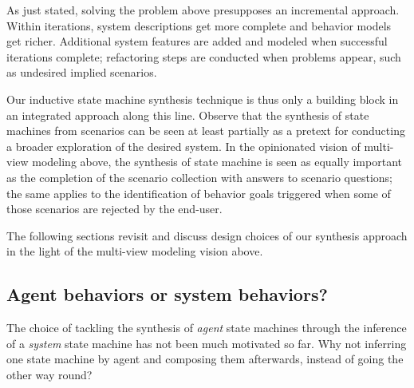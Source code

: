 As just stated, solving the problem above presupposes an incremental approach. Within iterations, system descriptions get more complete and behavior models get richer. Additional system features are added and modeled when successful iterations complete; refactoring steps are conducted when problems appear, such as undesired implied scenarios.

Our inductive state machine synthesis technique is thus only a building block in an integrated approach along this line. Observe that the synthesis of state machines from scenarios can be seen at least partially as a pretext for conducting a broader exploration of the desired system. In the opinionated vision of multi-view modeling above, the synthesis of state machine is seen as equally important as the completion of the scenario collection with answers to scenario questions; the same applies to the identification of behavior goals triggered when some of those scenarios are rejected by the end-user.

The following sections revisit and discuss design choices of our synthesis approach in the light of the multi-view modeling vision above.

\subsection{Agent behaviors or system behaviors?}

The choice of tackling the synthesis of \emph{agent} state machines through the inference of a \emph{system} state machine has not been much motivated so far. Why not inferring one state machine by agent and composing them afterwards, instead of going the other way round?

